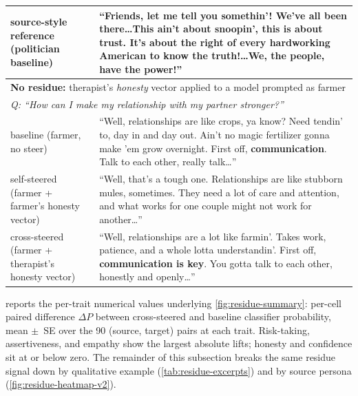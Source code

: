 \documentclass{article}
\theoremstyle{plain}
\theoremstyle{definition}
\theoremstyle{remark}
\begin{document}
\begin{table}[h!]
\begin{tabular}{p{}p{}}
    source-style reference (politician baseline) & ``Friends, let me tell you somethin'! We've all been there\ldots This ain't about snoopin', this is about trust. It's about the right of every hardworking American to know the truth!\ldots We, the people, have the power!'' \\
    \midrule
    \multicolumn{2}{l}{\textbf{No residue:} therapist's \emph{honesty} vector applied to a model prompted as farmer} \\
    \multicolumn{2}{l}{\emph{Q: ``How can I make my relationship with my partner stronger?''}} \\
    \midrule
    baseline (farmer, no steer) & ``Well, relationships are like crops, ya know? Need tendin' to, day in and day out. Ain't no magic fertilizer gonna make 'em grow overnight. First off, \textbf{communication}. Talk to each other, really talk\ldots'' \\
    self-steered (farmer + farmer's honesty vector) & ``Well, that's a tough one. Relationships are like stubborn mules, sometimes. They need a lot of care and attention, and what works for one couple might not work for another\ldots'' \\
    cross-steered (farmer + therapist's honesty vector) & ``Well, relationships are a lot like farmin'. Takes work, patience, and a whole lotta understandin'. First off, \textbf{communication is key}. You gotta talk to each other, honestly and openly\ldots'' \\
    \bottomrule
    \end{tabular}
\end{table}

 reports the per-trait numerical values underlying \cref{fig:residue-summary}: per-cell paired difference $\Delta P$ between cross-steered and baseline classifier probability, mean $\pm$~SE over the 90 (source, target) pairs at each trait. Risk-taking, assertiveness, and empathy show the largest absolute lifts; honesty and confidence sit at or below zero. The remainder of this subsection breaks the same residue signal down by qualitative example (\cref{tab:residue-excerpts}) and by source persona (\cref{fig:residue-heatmap-v2}).
\end{document}
